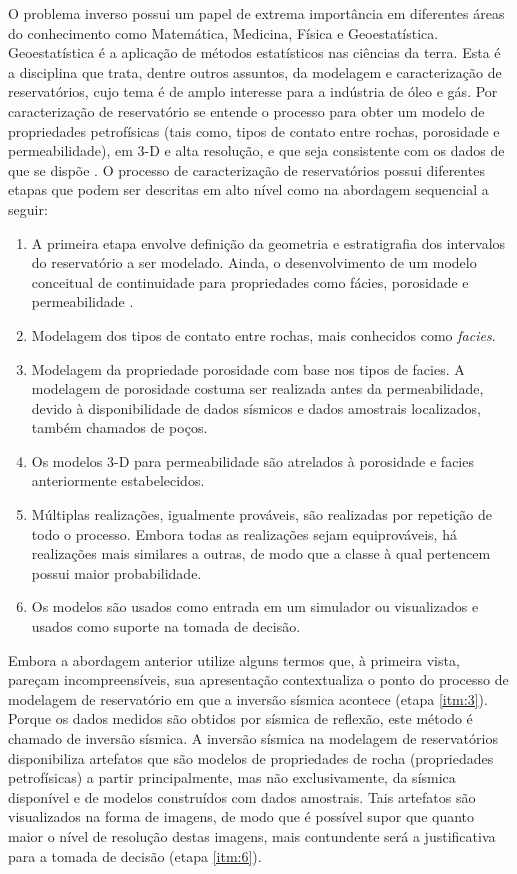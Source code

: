 O problema inverso possui um papel de extrema importância em diferentes áreas do conhecimento
como Matemática, Medicina, Física e Geoestatística. Geoestatística é a aplicação de métodos
estatísticos nas ciências da terra. Esta é a disciplina que trata, dentre outros assuntos, da modelagem
e caracterização de reservatórios, cujo tema é de amplo interesse para a indústria de óleo
e gás. Por caracterização de reservatório se entende o processo para obter um modelo de propriedades
petrofísicas (tais como, tipos de contato entre rochas, porosidade e permeabilidade),
em 3-D e alta resolução, e que seja consistente com os dados de que se dispõe \citep{deutsch2002}.
O processo de caracterização de reservatórios possui diferentes
etapas que podem ser descritas em alto nível como na abordagem sequencial a seguir:
\begin{enumerate}
 \item A primeira etapa envolve definição da geometria e estratigrafia dos intervalos do reservatório
 a ser modelado. Ainda, o desenvolvimento de um modelo conceitual de continuidade para
 propriedades como fácies, porosidade e permeabilidade \label{itm:1}.
 \item Modelagem dos tipos de contato entre rochas, mais conhecidos como \textit{facies}\label{itm:2}.
 \item Modelagem da propriedade porosidade com base nos tipos de facies. A modelagem de porosidade
 costuma ser realizada antes da permeabilidade, devido à disponibilidade de dados sísmicos e dados
 amostrais localizados, também chamados de poços\label{itm:3}.
 \item Os modelos 3-D para permeabilidade são atrelados à porosidade e facies anteriormente estabelecidos\label{itm:4}.
 \item Múltiplas realizações, igualmente prováveis, são realizadas por repetição de todo o processo. Embora todas as
 realizações sejam equiprováveis, há realizações mais similares a outras, de modo que a classe à qual pertencem possui
 maior probabilidade\label{itm:5}.
 \item Os modelos são usados como entrada em um simulador ou visualizados e usados como suporte na tomada de decisão\label{itm:6}.
\end{enumerate}

Embora a abordagem anterior utilize alguns termos que, à primeira vista, pareçam incompreensíveis,
sua apresentação contextualiza o ponto do processo de modelagem de
reservatório em que a inversão sísmica acontece (etapa \ref{itm:3}).
Porque os dados medidos são obtidos por sísmica de reflexão,
este método é chamado de inversão sísmica. A inversão sísmica na
modelagem de reservatórios disponibiliza artefatos que são modelos de propriedades de rocha
(propriedades petrofísicas) a partir principalmente, mas não exclusivamente,
da sísmica disponível e de modelos construídos com dados amostrais. Tais artefatos
são visualizados na forma de imagens, de modo que é possível supor que quanto maior
o nível de resolução destas imagens, mais contundente será a justificativa para a tomada de decisão
(etapa \ref{itm:6}).


